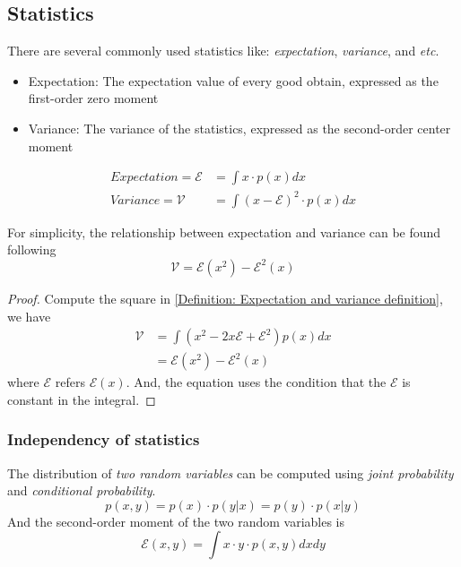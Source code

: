 \documentclass[../main.tex]{subfiles}
\begin{document}
\subsection{Statistics}
There are several commonly used statistics like: \emph{expectation}, \emph{variance}, and \textit{etc}.
\begin{itemize}
    \item Expectation: The expectation value of every good obtain, expressed as the first-order zero moment
    \item Variance: The variance of the statistics, expressed as the second-order center moment
\end{itemize}
\begin{equation}
    \label{Definition: Expectation and variance definition}
    \begin{split}
        Expectation = \mathcal{E} & = \int x \cdot p(x) dx                 \\
        Variance = \mathcal{V}    & = \int (x-\mathcal{E})^2 \cdot p(x) dx
    \end{split}
\end{equation}
\begin{lemma}
    \label{Lemma: Relationship between expectation and variance}
    For simplicity, the relationship between expectation and variance can be found following
    \begin{equation*}
        \mathcal{V} = \mathcal{E}(x^2) - \mathcal{E}^2(x)
    \end{equation*}
    \begin{proof}
        Compute the square in \eqref{Definition: Expectation and variance definition},
        we have
        \begin{align*}
            \mathcal{V} & = \int (x^2 - 2 x \mathcal{E} + \mathcal{E}^2) p(x) dx \\
                        & = \mathcal{E}(x^2) - \mathcal{E}^2(x)
        \end{align*}
        where $\mathcal{E}$ refers $\mathcal{E}(x)$.
        And, the equation uses the condition that the $\mathcal{E}$ is constant in the integral.
    \end{proof}
\end{lemma}

\subsubsection{Independency of statistics}
The distribution of \emph{two random variables} can be computed using \emph{joint probability} and \emph{conditional probability}.
\begin{equation*}
    p(x, y) = p(x) \cdot p(y|x) = p(y) \cdot p(x|y)
\end{equation*}
And the second-order moment of the two random variables is
\begin{equation*}
    \mathcal{E}(x, y) = \int x \cdot y \cdot p(x, y) dx dy
\end{equation*}
\end{document}
